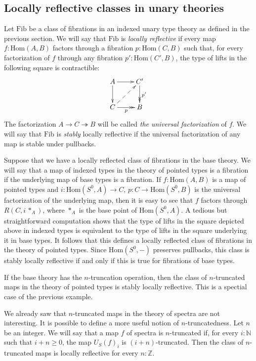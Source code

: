 \documentclass[reqno]{mscs}
\newcommand{\fs}[1]{\mathrm{#1}}
\newcommand{\Hom}{\fs{Hom}}
\newcommand{\Fib}{\fs{Fib}}
\numberwithin{figure}{section}
\begin{document}
\subsection{Locally reflective classes in unary theories}

Let $\Fib$ be a class of fibrations in an indexed unary type theory as defined in the previous section.
We will say that $\Fib$ is \emph{locally reflective} if every map $f : \Hom(A,B)$ factors through a fibration $p : \Hom(C,B)$
such that, for every factorization of $f$ through any fibration $p' : \Hom(C',B)$, the type of lifts in the following square is contractible:
\[ \xymatrix{ A \ar[r] \ar[d]                   & C' \ar@{->>}[d]^{p'} \\
              C \ar@{->>}[r]_p \ar@{-->}[ur]    & B
            } \]
The factorization $A \to C \twoheadrightarrow B$ will be called \emph{the universal factorization} of $f$.
We will say that $\Fib$ is \emph{stably} locally reflective if the universal factorization of any map is stable under pullbacks.

\begin{example}
Suppose that we have a locally reflected class of fibrations in the base theory.
We will say that a map of indexed types in the theory of pointed types is a fibration if the underlying map of base types is a fibration.
If $f : \Hom(A,B)$ is a map of pointed types and $i : \Hom(S^0,A) \to C$, $p : C \to \Hom(S^0,B)$ is the universal factorization of the underlying map,
then it is easy to see that $f$ factors through $R(C, i\,*_A)$, where $*_A$ is the base point of $\Hom(S^0,A)$.
A tedious but straightforward computation shows that the type of lifts in the square depicted above in indexed types is equivalent to the type of lifts in the square underlying it in base types.
It follows that this defines a locally reflected class of fibrations in the theory of pointed types.
Since $\Hom(S^0,-)$ preserves pullbacks, this class is stably locally reflective if and only if this is true for fibrations of base types.
\end{example}

\begin{example}
If the base theory has the $n$-truncation operation, then the class of $n$-truncated maps in the theory of pointed types is stably locally reflective.
This is a spectial case of the previous example.
\end{example}

\begin{example}
We already saw that $n$-truncated maps in the theory of spectra are not interesting.
It is possible to define a more useful notion of $n$-truncatedness.
Let $n$ be an integer.
We will say that a map $f$ of spectra is $n$-truncated if, for every $i : \mathbb{N}$ such that $i + n \geq 0$, the map $U_S(f)_i$ is $(i + n)$-truncated.
Then the class of $n$-truncated maps is locally reflective for every $n : \mathbb{Z}$.
\end{example}
\end{document}
